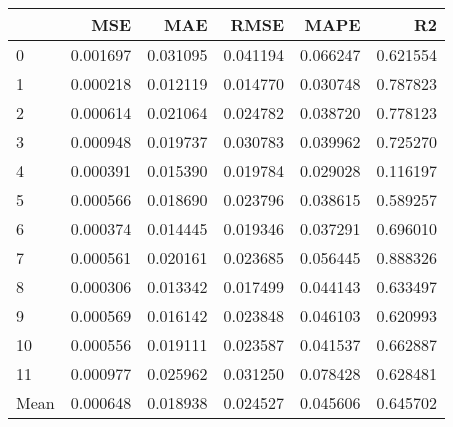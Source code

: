 \begin{tabular}{lrrrrr}
\toprule
 & MSE & MAE & RMSE & MAPE & R2 \\
\midrule
0 & 0.001697 & 0.031095 & 0.041194 & 0.066247 & 0.621554 \\
1 & 0.000218 & 0.012119 & 0.014770 & 0.030748 & 0.787823 \\
2 & 0.000614 & 0.021064 & 0.024782 & 0.038720 & 0.778123 \\
3 & 0.000948 & 0.019737 & 0.030783 & 0.039962 & 0.725270 \\
4 & 0.000391 & 0.015390 & 0.019784 & 0.029028 & 0.116197 \\
5 & 0.000566 & 0.018690 & 0.023796 & 0.038615 & 0.589257 \\
6 & 0.000374 & 0.014445 & 0.019346 & 0.037291 & 0.696010 \\
7 & 0.000561 & 0.020161 & 0.023685 & 0.056445 & 0.888326 \\
8 & 0.000306 & 0.013342 & 0.017499 & 0.044143 & 0.633497 \\
9 & 0.000569 & 0.016142 & 0.023848 & 0.046103 & 0.620993 \\
10 & 0.000556 & 0.019111 & 0.023587 & 0.041537 & 0.662887 \\
11 & 0.000977 & 0.025962 & 0.031250 & 0.078428 & 0.628481 \\
Mean & 0.000648 & 0.018938 & 0.024527 & 0.045606 & 0.645702 \\
\bottomrule
\end{tabular}
